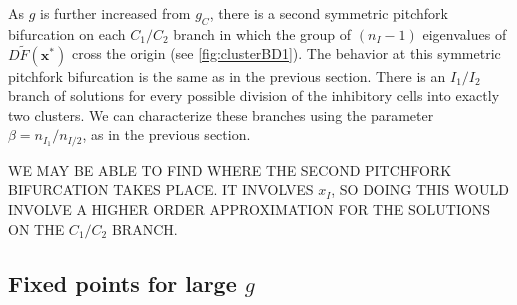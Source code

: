\documentclass[11pt,reqno]{amsart}
\newcommand{\xvec}{\mathbf{x}}
\begin{document}
As $g$ is further increased from $g_C$, there is a second symmetric pitchfork bifurcation on each $C_1/C_2$ branch in which the group of $(n_I-1)$ eigenvalues of $D\tilde{F}(\xvec^*)$ cross the origin (see \cref{fig:clusterBD1}). The behavior at this symmetric pitchfork bifurcation is the same as in the previous section. There is an $I_1/I_2$ branch of solutions for every possible division of the inhibitory cells into exactly two clusters. We can characterize these branches using the parameter $\beta = n_{I_1}/n_{I/2}$, as in the previous section.

WE MAY BE ABLE TO FIND WHERE THE SECOND PITCHFORK BIFURCATION TAKES PLACE. IT INVOLVES $x_I$, SO DOING THIS WOULD INVOLVE A HIGHER ORDER APPROXIMATION FOR THE SOLUTIONS ON THE $C_1/C_2$ BRANCH.

\subsection{Fixed points for large $g$}
\end{document}

